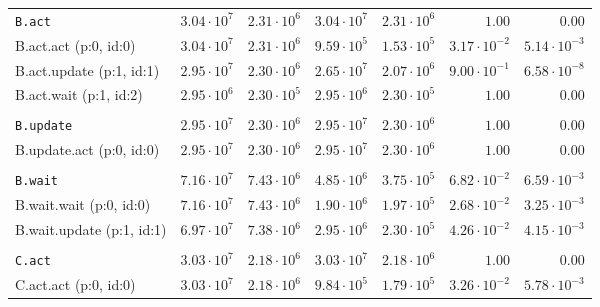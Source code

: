 \begin{table}[htbp]
{\begin{tabular}{lrrrrrr}
\\[-8pt]\texttt{B.act}                & $3.04 \cdot 10^{7}$ & $2.31 \cdot 10^{6}$ & $3.04 \cdot 10^{7}$ & $2.31 \cdot 10^{6}$ &               $1.00$ &               $0.00$ \\
\hspace{3mm}B.act.act (p:0, id:0)     & $3.04 \cdot 10^{7}$ & $2.31 \cdot 10^{6}$ & $9.59 \cdot 10^{5}$ & $1.53 \cdot 10^{5}$ & $3.17 \cdot 10^{-2}$ & $5.14 \cdot 10^{-3}$ \\
\hspace{3mm}B.act.update (p:1, id:1)  & $2.95 \cdot 10^{7}$ & $2.30 \cdot 10^{6}$ & $2.65 \cdot 10^{7}$ & $2.07 \cdot 10^{6}$ & $9.00 \cdot 10^{-1}$ & $6.58 \cdot 10^{-8}$ \\
\hspace{3mm}B.act.wait (p:1, id:2)    & $2.95 \cdot 10^{6}$ & $2.30 \cdot 10^{5}$ & $2.95 \cdot 10^{6}$ & $2.30 \cdot 10^{5}$ &               $1.00$ &               $0.00$ \\
\\[-8pt]\texttt{B.update}             & $2.95 \cdot 10^{7}$ & $2.30 \cdot 10^{6}$ & $2.95 \cdot 10^{7}$ & $2.30 \cdot 10^{6}$ &               $1.00$ &               $0.00$ \\
\hspace{3mm}B.update.act (p:0, id:0)  & $2.95 \cdot 10^{7}$ & $2.30 \cdot 10^{6}$ & $2.95 \cdot 10^{7}$ & $2.30 \cdot 10^{6}$ &               $1.00$ &               $0.00$ \\
\\[-8pt]\texttt{B.wait}               & $7.16 \cdot 10^{7}$ & $7.43 \cdot 10^{6}$ & $4.85 \cdot 10^{6}$ & $3.75 \cdot 10^{5}$ & $6.82 \cdot 10^{-2}$ & $6.59 \cdot 10^{-3}$ \\
\hspace{3mm}B.wait.wait (p:0, id:0)   & $7.16 \cdot 10^{7}$ & $7.43 \cdot 10^{6}$ & $1.90 \cdot 10^{6}$ & $1.97 \cdot 10^{5}$ & $2.68 \cdot 10^{-2}$ & $3.25 \cdot 10^{-3}$ \\
\hspace{3mm}B.wait.update (p:1, id:1) & $6.97 \cdot 10^{7}$ & $7.38 \cdot 10^{6}$ & $2.95 \cdot 10^{6}$ & $2.30 \cdot 10^{5}$ & $4.26 \cdot 10^{-2}$ & $4.15 \cdot 10^{-3}$ \\
\\[-8pt]\texttt{C.act}                & $3.03 \cdot 10^{7}$ & $2.18 \cdot 10^{6}$ & $3.03 \cdot 10^{7}$ & $2.18 \cdot 10^{6}$ &               $1.00$ &               $0.00$ \\
\hspace{3mm}C.act.act (p:0, id:0)     & $3.03 \cdot 10^{7}$ & $2.18 \cdot 10^{6}$ & $9.84 \cdot 10^{5}$ & $1.79 \cdot 10^{5}$ & $3.26 \cdot 10^{-2}$ & $5.78 \cdot 10^{-3}$ \\

\end{tabular}}
\end{table}
